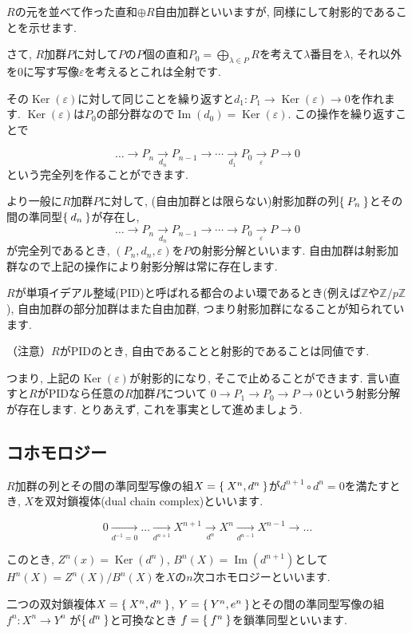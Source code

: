 \documentclass{jsarticle}
\newcommand{\ZZ}{\mathbb{Z}}
\newcommand{\makeop}[1]{\mathop{\mathrm{#1}}\nolimits}
\def\Im{\makeop{Im}}
\def\Ker{\makeop{Ker}}
\theoremstyle{definition}
\numberwithin{theorem}{section}
\begin{document}
$R$の元を並べて作った直和$\oplus R$自由加群といいますが, 同様にして射影的であることを示せます.

さて, $R$加群$P$に対して$P$の$P$個の直和$\displaystyle P_0 = \bigoplus_{\lambda\in P} R$を考えて$\lambda$番目を$\lambda$, それ以外を0に写す写像$\varepsilon$を考えるとこれは全射です.

その$\Ker(\varepsilon)$に対して同じことを繰り返すと$d_1: P_1 \rightarrow \Ker(\varepsilon) \rightarrow 0$を作れます.
$\Ker(\varepsilon)$は$P_0$の部分群なので$\Im(d_0) = \Ker(\varepsilon)$. この操作を繰り返すことで

\[
\ldots \rightarrow P_n \xrightarrow[d_n]{} P_{n-1} \rightarrow \cdots \xrightarrow[d_1]{} P_0 \xrightarrow[\varepsilon]{} P \rightarrow 0
\]
という完全列を作ることができます.

より一般に$R$加群$P$に対して, (自由加群とは限らない)射影加群の列$\Set{P_n}$とその間の準同型$\Set{d_n}$が存在し, 
\[
\ldots \rightarrow P_n \xrightarrow[d_n]{} P_{n-1} \rightarrow \cdots \rightarrow P_0 \xrightarrow[\varepsilon]{} P \rightarrow 0
\]
が完全列であるとき, $(P_n, d_n, \varepsilon)$を$P$の射影分解といいます. 自由加群は射影加群なので上記の操作により射影分解は常に存在します.

$R$が単項イデアル整域(PID)と呼ばれる都合のよい環であるとき(例えば$\ZZ$や$\ZZ/p\ZZ$), 自由加群の部分加群はまた自由加群, つまり射影加群になることが知られています.

（注意）$R$がPIDのとき, 自由であることと射影的であることは同値です.

つまり, 上記の$\Ker(\varepsilon)$が射影的になり, そこで止めることができます. 言い直すと$R$がPIDなら任意の$R$加群$P$について
$0\rightarrow P_1 \rightarrow P_0 \rightarrow P \rightarrow 0$という射影分解が存在します. とりあえず, これを事実として進めましょう.

\subsection{コホモロジー}
$R$加群の列とその間の準同型写像の組$X = \Set{X^n, d^n}$が$d^{n+1} \circ d^n = 0$を満たすとき, $X$を双対鎖複体(dual chain complex)といいます.

\[
0 \xrightarrow[d^{-1} = 0]{} \ldots \xrightarrow[d^{n+1}]{} X^{n+1} \xrightarrow[d^n]{} X^n \xrightarrow[d^{n-1}]{} X^{n-1} \rightarrow \ldots
\]

このとき, $Z^n(x) = \Ker(d^n)$, $B^n(X) = \Im(d^{n+1})$として$H^n(X) = Z^n(X)/B^n(X)$を$X$の$n$次コホモロジーといいます.

二つの双対鎖複体$X = \Set{X^n, d^n}$, $Y = \Set{Y^n, e^n}$とその間の準同型写像の組$f^n:X^n \rightarrow Y^n$
が$\Set{d^n}$と可換なとき $f = \Set{f^n}$を鎖準同型といいます.
\end{document}
